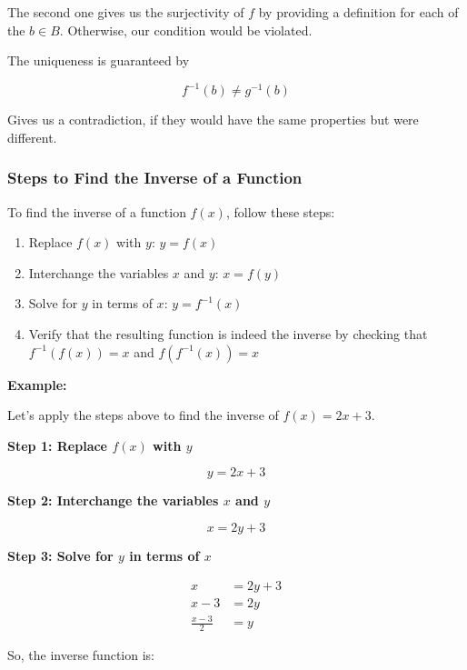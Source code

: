 The second one gives us the surjectivity of \(f\) by providing a definition for each of the \(b \in B\). Otherwise, 
our condition would be violated. 

The uniqueness is guaranteed by 

\[
	f^{-1}(b) \ne g^{-1}(b)
\]

Gives us a contradiction, if they would have the same properties but were different.

\QED

\subsubsection{Steps to Find the Inverse of a Function}

To find the inverse of a function \(f (x)\), follow these steps:

\begin{enumerate}
	
	\item Replace \(f (x)\) with \(y\): \(y = f (x)\)
	
	\item Interchange the variables \(x\) and \(y\): \(x = f (y)\)
	
	\item Solve for \(y\) in terms of \(x\): \(y = f^{-1} (x)\)
	
	\item Verify that the resulting function is indeed the inverse by checking that \(f^{-1}(f(x)) = x\) 
		  and \(f (f^{-1} (x)) = x\)

		\end{enumerate}

\textbf{Example:}

Let's apply the steps above to find the inverse of \(f (x) = 2x + 3\).

\textbf{Step 1: Replace \(f(x)\) with \(y\)}

\[
	y = 2x + 3
\]

\textbf{Step 2: Interchange the variables \(x\) and \(y\)}

\[
	x = 2y + 3
\]

\textbf{Step 3: Solve for \(y\) in terms of \(x\)}

\begin{align*}
	x               & = 2y + 3 \\
	x - 3           & = 2y     \\
	\frac{x - 3}{2} & = y
\end{align*}

So, the inverse function is:

